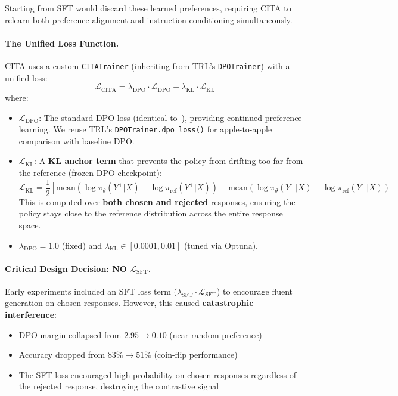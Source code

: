 Starting from SFT would discard these learned preferences, requiring CITA to relearn both preference alignment and instruction conditioning simultaneously.

\paragraph{The Unified Loss Function.} CITA uses a custom \texttt{CITATrainer} (inheriting from TRL's \texttt{DPOTrainer}) with a unified loss:
\begin{equation}
    \mathcal{L}_{\text{CITA}} = \lambda_{\text{DPO}} \cdot \mathcal{L}_{\text{DPO}} + \lambda_{\text{KL}} \cdot \mathcal{L}_{\text{KL}}
\end{equation}
where:
\begin{itemize}[leftmargin=*]
    \item $\mathcal{L}_{\text{DPO}}$: The standard DPO loss (identical to~\cite{rafailov2023direct}), providing continued preference learning. We reuse TRL's \texttt{DPOTrainer.dpo\_loss()} for apple-to-apple comparison with baseline DPO.

    \item $\mathcal{L}_{\text{KL}}$: A \textbf{KL anchor term} that prevents the policy from drifting too far from the reference (frozen DPO checkpoint):
    \begin{equation}
        \mathcal{L}_{\text{KL}} = \frac{1}{2} \left[ \text{mean}\left(\log \pi_\theta(Y^+ | X) - \log \pi_{\text{ref}}(Y^+ | X)\right) + \text{mean}\left(\log \pi_\theta(Y^- | X) - \log \pi_{\text{ref}}(Y^- | X)\right) \right]
    \end{equation}
    This is computed over \textbf{both chosen and rejected} responses, ensuring the policy stays close to the reference distribution across the entire response space.

    \item $\lambda_{\text{DPO}} = 1.0$ (fixed) and $\lambda_{\text{KL}} \in [0.0001, 0.01]$ (tuned via Optuna).
\end{itemize}

\paragraph{Critical Design Decision: NO $\mathcal{L}_{\text{SFT}}$.} Early experiments included an SFT loss term ($\lambda_{\text{SFT}} \cdot \mathcal{L}_{\text{SFT}}$) to encourage fluent generation on chosen responses. However, this caused \textbf{catastrophic interference}:
\begin{itemize}[leftmargin=*]
    \item DPO margin collapsed from $2.95 \rightarrow 0.10$ (near-random preference)
    \item Accuracy dropped from $83\% \rightarrow 51\%$ (coin-flip performance)
    \item The SFT loss encouraged high probability on chosen responses regardless of the rejected response, destroying the contrastive signal
\end{itemize}

